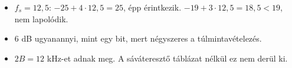 \begin{center}\end{center}
\begin{eredmeny}

\begin{center}\end{center}
\end{eredmeny}
\begin{tipp}[Ellenőrzés]
\begin{itemize}
\item $f_s=12{,}5$: $-25+4\cdot12{,}5=25$, épp érintkezik. $-19+3\cdot12{,}5=18{,}5<19$, nem lapolódik.
\item $6$ dB ugyanannyi, mint egy bit, mert négyszeres a túlmintavételezés.
\end{itemize}
\end{tipp}
\begin{figyelem}
\begin{itemize}
\item $2B=12$ kHz-et adnak meg. A sáváteresztő táblázat nélkül ez nem derül ki.
\end{itemize}
\end{figyelem}


